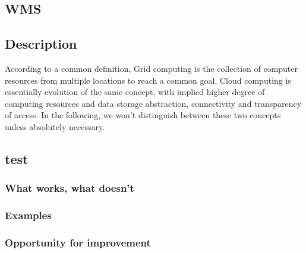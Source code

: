 \subsection{WMS}
\subsection{Description}
According to a common definition, Grid computing is the collection of computer resources from multiple locations to reach a common goal. Cloud computing is essentially evolution of the same concept, with implied higher degree of computing resources and data storage abstraction, connectivity and transparency of access. In the following, we won't distinguish between these two concepts unless absolutely necessary.



\subsection{test}
\subsubsection{What works, what doesn't}
\subsubsection{Examples}
\subsubsection{Opportunity for improvement}
